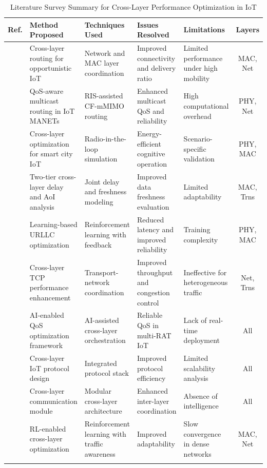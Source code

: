 \documentclass[a4paper]{cas-dc}
\numberwithin{equation}{section}
\begin{document}
\begin{table}[t]
\centering
\caption{Literature Survey Summary for Cross-Layer Performance Optimization in IoT}
\label{tab:literature_survey}
\small
\begin{tabularx}{\textwidth}{@{} c X X X X c @{}}
\toprule
\textbf{Ref.} & \textbf{Method Proposed} & \textbf{Techniques Used} & \textbf{Issues Resolved} & \textbf{Limitations} & \textbf{Layers} \\
\midrule
\cite{Khalil2024} & Cross-layer routing for opportunistic IoT & Network and MAC layer coordination & Improved connectivity and delivery ratio & Limited performance under high mobility & MAC, Net \\ \addlinespace
\cite{Tran202411876} & QoS-aware multicast routing in IoT MANETs & RIS-assisted CF-mMIMO routing & Enhanced multicast QoS and reliability & High computational overhead & PHY, Net \\ \addlinespace
\cite{Böhm2024157} & Cross-layer optimization for smart city IoT & Radio-in-the-loop simulation & Energy-efficient cognitive operation & Scenario-specific validation & PHY, MAC \\ \addlinespace
\cite{Cheikh2022} & Two-tier cross-layer delay and AoI analysis & Joint delay and freshness modeling & Improved data freshness evaluation & Limited adaptability & MAC, Trns \\ \addlinespace
\cite{Zhang202214629} & Learning-based URLLC optimization & Reinforcement learning with feedback & Reduced latency and improved reliability & Training complexity & PHY, MAC \\ \addlinespace
\cite{Parween2022383} & Cross-layer TCP performance enhancement & Transport-network coordination & Improved throughput and congestion control & Ineffective for heterogeneous traffic & Net, Trns \\ \addlinespace
\cite{Zia20221906} & AI-enabled QoS optimization framework & AI-assisted cross-layer orchestration & Reliable QoS in multi-RAT IoT & Lack of real-time deployment & All \\ \addlinespace
\cite{Resner201824} & Cross-layer IoT protocol design & Integrated protocol stack & Improved protocol efficiency & Limited scalability analysis & All \\ \addlinespace
\cite{Han2013622} & Cross-layer communication module & Modular cross-layer architecture & Enhanced inter-layer coordination & Absence of intelligence & All \\ \addlinespace
\cite{Musaddiq20201} & RL-enabled cross-layer optimization & Reinforcement learning with traffic awareness & Improved adaptability & Slow convergence in dense networks & MAC, Net \\ \addlinespace

\end{tabularx}
\end{table}
\end{document}
